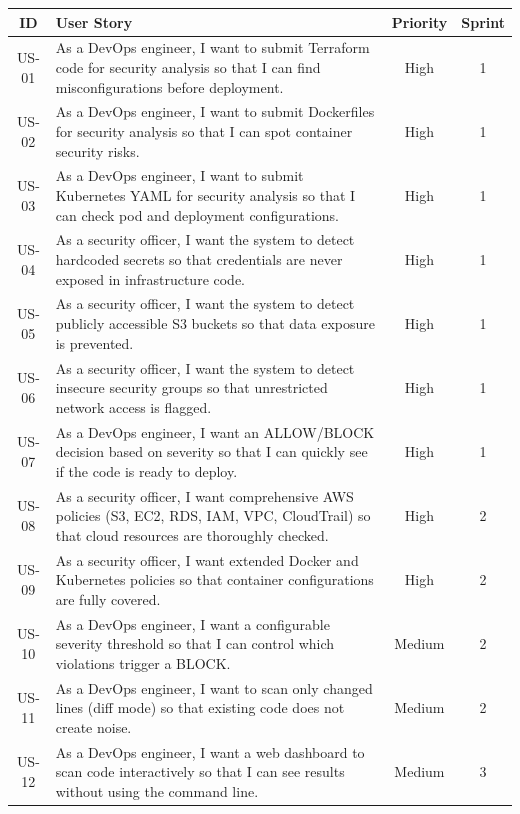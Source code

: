 \begin{table}[H]
\centering
\small
\begin{tabularx}{\textwidth}{|c|X|c|c|}
\hline
\textbf{ID} & \textbf{User Story} & \textbf{Priority} & \textbf{Sprint} \\
\hline
US-01 & As a DevOps engineer, I want to submit Terraform code for security analysis so that I can find misconfigurations before deployment. & High & 1 \\
\hline
US-02 & As a DevOps engineer, I want to submit Dockerfiles for security analysis so that I can spot container security risks. & High & 1 \\
\hline
US-03 & As a DevOps engineer, I want to submit Kubernetes YAML for security analysis so that I can check pod and deployment configurations. & High & 1 \\
\hline
US-04 & As a security officer, I want the system to detect hardcoded secrets so that credentials are never exposed in infrastructure code. & High & 1 \\
\hline
US-05 & As a security officer, I want the system to detect publicly accessible S3 buckets so that data exposure is prevented. & High & 1 \\
\hline
US-06 & As a security officer, I want the system to detect insecure security groups so that unrestricted network access is flagged. & High & 1 \\
\hline
US-07 & As a DevOps engineer, I want an ALLOW/BLOCK decision based on severity so that I can quickly see if the code is ready to deploy. & High & 1 \\
\hline
US-08 & As a security officer, I want comprehensive AWS policies (S3, EC2, RDS, IAM, VPC, CloudTrail) so that cloud resources are thoroughly checked. & High & 2 \\
\hline
US-09 & As a security officer, I want extended Docker and Kubernetes policies so that container configurations are fully covered. & High & 2 \\
\hline
US-10 & As a DevOps engineer, I want a configurable severity threshold so that I can control which violations trigger a BLOCK. & Medium & 2 \\
\hline
US-11 & As a DevOps engineer, I want to scan only changed lines (diff mode) so that existing code does not create noise. & Medium & 2 \\
\hline
US-12 & As a DevOps engineer, I want a web dashboard to scan code interactively so that I can see results without using the command line. & Medium & 3 \\

\end{tabularx}
\end{table}
